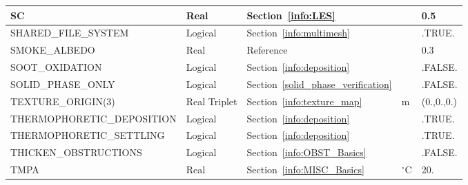 \documentclass[11pt]{book}
\begin{document}
\begin{longtable}{@{\extracolsep{\fill}}|l|l|l|l|l|}
{\ct SC}                                        & Real          & Section~\ref{info:LES}                                &               & 0.5               \\ \hline
{\ct SHARED\_FILE\_SYSTEM}                      & Logical       & Section~\ref{info:multimesh}                          &               & {\ct .TRUE.}      \\ \hline
{\ct SMOKE\_ALBEDO}                             & Real          & Reference~\cite{Smokeview_Users_Guide}                &               & 0.3               \\ \hline
{\ct SOOT\_OXIDATION}                           & Logical       & Section~\ref{info:deposition}                         &               & {\ct .FALSE.}      \\ \hline
{\ct SOLID\_PHASE\_ONLY}                        & Logical       & Section~\ref{solid_phase_verification}                &               & {\ct .FALSE.}     \\ \hline
{\ct TEXTURE\_ORIGIN(3)}                        & Real Triplet  & Section~\ref{info:texture_map}                        & m             & (0.,0.,0.)        \\ \hline
{\ct THERMOPHORETIC\_DEPOSITION}                & Logical       & Section~\ref{info:deposition}                         &               & {\ct .TRUE.}      \\ \hline
{\ct THERMOPHORETIC\_SETTLING}                  & Logical       & Section~\ref{info:deposition}                         &               & {\ct .TRUE.}      \\ \hline
{\ct THICKEN\_OBSTRUCTIONS}                     & Logical       & Section~\ref{info:OBST_Basics}                        &               & {\ct .FALSE.}     \\ \hline
{\ct TMPA}                                      & Real          & Section~\ref{info:MISC_Basics}                        & $^\circ$C     & 20.               \\ \hline

\end{longtable}
\end{document}
